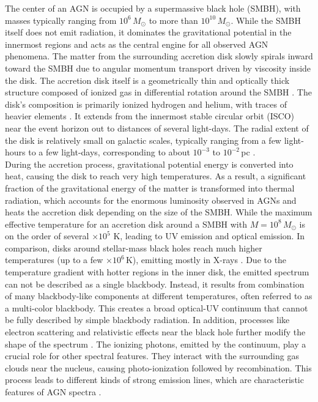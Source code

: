 The center of an AGN is occupied by a supermassive black hole (SMBH), with masses typically ranging from $10^6\,M_\odot$ to more than $10^{10}\,M_\odot$. While the SMBH itself does not emit radiation, it dominates the gravitational potential in the innermost regions and acts as the central engine for all observed AGN phenomena. The matter from the surrounding accretion disk slowly spirals inward toward the SMBH due to angular momentum transport driven by viscosity inside the disk. The accretion disk itself is a geometrically thin and optically thick structure composed of ionized gas in differential rotation around the SMBH \parencite{shakura1973black}. The disk's composition is primarily ionized hydrogen and helium, with traces of heavier elements \parencite{netzer2013agn}. It extends from the innermost stable circular orbit (ISCO) near the event horizon out to distances of several light-days. The radial extent of the disk is relatively small on galactic scales, typically ranging from a few light-hours to a few light-days, corresponding to about $10^{-3}$ to $10^{-2}$\,pc \parencite{netzer2013agn,hickox2018obscured}.  \\
During the accretion process, gravitational potential energy is converted into heat, causing the disk to reach very high temperatures. As a result, a significant fraction of the gravitational energy of the matter is transformed into thermal radiation, which accounts for the enormous luminosity observed in AGNs and heats the accretion disk depending on the size of the SMBH. While the maximum effective temperature for an accretion disk around a SMBH with $M = 10^8\,M_\odot$ is on the order of several $\times 10^5$ K, leading to UV emission and optical emission. In comparison, disks around stellar-mass black holes reach much higher temperatures (up to a few $\times 10^6$\,K), emitting mostly in X-rays \parencite{netzer2013agn}. Due to the temperature gradient with hotter regions in the inner disk, the emitted spectrum can not be described as a single blackbody. Instead, it results from combination of many blackbody-like components at different temperatures, often referred to as a multi-color blackbody. This creates a broad optical-UV continuum that cannot be fully described by simple blackbody radiation. In addition, processes like electron scattering and relativistic effects near the black hole further modify the shape of the spectrum \parencite{netzer2013agn}.
The ionizing photons, emitted by the continuum, play a crucial role for other spectral features. They interact with the surrounding gas clouds near the nucleus, causing photo-ionization followed by recombination. This process leads to different kinds of strong emission lines, which are characteristic features of AGN spectra \parencite{osterbrock1989agn}.


